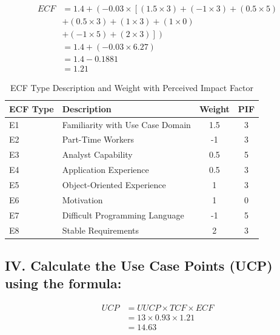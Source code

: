 \documentclass[english,12pt,a4paper]{report}
\begin{document}
		\begin{equation}
			\begin{aligned}
				ECF &= 1.4 + \left(-0.03 \times \left[(1.5 \times 3) + (-1 	\times 3) + (0.5 \times 5) \right.\right. \\
				&\left.\left. + (0.5 \times 3) + (1 \times 3) + (1 \times 0) 	\right. \right. \\
				&\left.\left. + (-1 \times 5) + (2 \times 3)\right] \right) \\
				&= 1.4 + \left(-0.03 \times 6.27\right) \\
				&= 1.4 - 0.1881 \\
				&= 1.21
			\end{aligned}
		\end{equation}
		
		\begin{table}[htbp]
			\centering
			\begin{tabular}{@{}llcc@{}}
				\toprule
				ECF Type & Description & Weight & PIF \\ 
				\midrule
				E1 & Familiarity with Use Case Domain & 1.5 & 3 \\ 
				E2 & Part-Time Workers & -1 & 3 \\ 
				E3 & Analyst Capability & 0.5 & 5 \\ 
				E4 & Application Experience & 0.5 & 3 \\ 
				E5 & Object-Oriented Experience & 1 & 3 \\ 
				E6 & Motivation & 1 & 0 \\ 
				E7 & Difficult Programming Language & -1 & 5 \\ 
				E8 & Stable Requirements & 2 & 3 \\ 
				\bottomrule
			\end{tabular}
			\caption{ECF Type Description and Weight with Perceived Impact Factor}
			\label{tab:ecf_table}
		\end{table}
		
		
		\subsection*{IV. Calculate the Use Case Points (UCP) using the formula:}
			\begin{equation}
				\begin{aligned}
					UCP &= UUCP \times TCF \times ECF \\
					&= 13 \times 0.93 \times 1.21 \\
					&= 14.63 
				\end{aligned}
			\end{equation}
			
\end{document}
